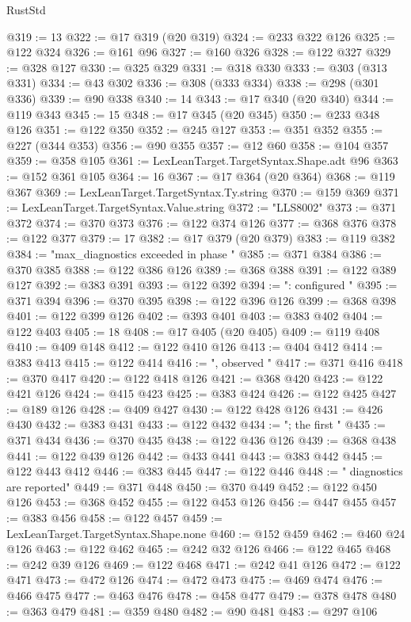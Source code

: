 \begin{lexlean}{RustStd}
\begin{coremodule}
@319 := 13
@322 := @17 @319 (@20 @319)
@324 := @233 @322 @126
@325 := @122 @324
@326 := @161 @96
@327 := @160 @326
@328 := @122 @327
@329 := @328 @127
@330 := @325 @329
@331 := @318 @330
@333 := @303 (@313 @331)
@334 := @43 @302
@336 := @308 (@333 @334)
@338 := @298 (@301 @336)
@339 := @90 @338
@340 := 14
@343 := @17 @340 (@20 @340)
@344 := @119 @343
@345 := 15
@348 := @17 @345 (@20 @345)
@350 := @233 @348 @126
@351 := @122 @350
@352 := @245 @127
@353 := @351 @352
@355 := @227 (@344 @353)
@356 := @90 @355
@357 := @12 @60
@358 := @104 @357
@359 := @358 @105
@361 := LexLeanTarget.TargetSyntax.Shape.adt @96
@363 := @152 @361 @105
@364 := 16
@367 := @17 @364 (@20 @364)
@368 := @119 @367
@369 := LexLeanTarget.TargetSyntax.Ty.string
@370 := @159 @369
@371 := LexLeanTarget.TargetSyntax.Value.string
@372 := "LLS8002"
@373 := @371 @372
@374 := @370 @373
@376 := @122 @374 @126
@377 := @368 @376
@378 := @122 @377
@379 := 17
@382 := @17 @379 (@20 @379)
@383 := @119 @382
@384 := "max_diagnostics exceeded in phase "
@385 := @371 @384
@386 := @370 @385
@388 := @122 @386 @126
@389 := @368 @388
@391 := @122 @389 @127
@392 := @383 @391
@393 := @122 @392
@394 := ": configured "
@395 := @371 @394
@396 := @370 @395
@398 := @122 @396 @126
@399 := @368 @398
@401 := @122 @399 @126
@402 := @393 @401
@403 := @383 @402
@404 := @122 @403
@405 := 18
@408 := @17 @405 (@20 @405)
@409 := @119 @408
@410 := @409 @148
@412 := @122 @410 @126
@413 := @404 @412
@414 := @383 @413
@415 := @122 @414
@416 := ", observed "
@417 := @371 @416
@418 := @370 @417
@420 := @122 @418 @126
@421 := @368 @420
@423 := @122 @421 @126
@424 := @415 @423
@425 := @383 @424
@426 := @122 @425
@427 := @189 @126
@428 := @409 @427
@430 := @122 @428 @126
@431 := @426 @430
@432 := @383 @431
@433 := @122 @432
@434 := "; the first "
@435 := @371 @434
@436 := @370 @435
@438 := @122 @436 @126
@439 := @368 @438
@441 := @122 @439 @126
@442 := @433 @441
@443 := @383 @442
@445 := @122 @443 @412
@446 := @383 @445
@447 := @122 @446
@448 := " diagnostics are reported"
@449 := @371 @448
@450 := @370 @449
@452 := @122 @450 @126
@453 := @368 @452
@455 := @122 @453 @126
@456 := @447 @455
@457 := @383 @456
@458 := @122 @457
@459 := LexLeanTarget.TargetSyntax.Shape.none
@460 := @152 @459
@462 := @460 @24 @126
@463 := @122 @462
@465 := @242 @32 @126
@466 := @122 @465
@468 := @242 @39 @126
@469 := @122 @468
@471 := @242 @41 @126
@472 := @122 @471
@473 := @472 @126
@474 := @472 @473
@475 := @469 @474
@476 := @466 @475
@477 := @463 @476
@478 := @458 @477
@479 := @378 @478
@480 := @363 @479
@481 := @359 @480
@482 := @90 @481
@483 := @297 @106

\end{coremodule}
\end{lexlean}
